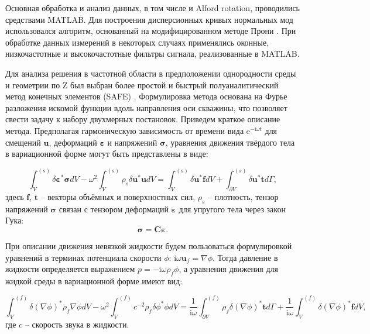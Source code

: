 \documentclass[a4paper,11pt]{article}
\newcommand{\ii}{\mathrm{i}}
\begin{document}
Основная обработка и анализ данных, в том числе и Alford rotation, проводились средствами MATLAB. Для построения дисперсионных кривых нормальных мод использовался алгоритм, основанный на модифицированном методе Прони \cite{Ekstrom1995}. При обработке данных измерений в некоторых случаях применялись оконные, низкочастотные и высокочастотные фильтры сигнала, реализованные в MATLAB.   

Для анализа решения в частотной области в предположении однородности среды и геометрии по Z был выбран более простой и быстрый полуаналитический метод конечных элементов (SAFE) \cite{Bartoli2006}. Формулировка метода основана на Фурье разложения искомой функции вдоль направления оси скважины, что позволяет свести задачу к набору двухмерных постановок. Приведем краткое описание метода. Предполагая гармоническую зависимость от времени вида $\mathrm{e}^{-\ii\omega t}$ для смещений $\mathbf{u}$, деформаций $\boldsymbol{\varepsilon}$ и напряжений $\boldsymbol{\sigma}$, уравнения движения твёрдого тела в вариационной форме могут быть представлены в виде:

\begin{equation}
\int_{V}^{(s)}\delta \boldsymbol{\varepsilon}^* \boldsymbol{\sigma} dV - \omega^2 \int_{V}^{(s)} \rho_s \delta \mathbf{u}^*\mathbf{u}dV = \int_{V}^{(s)}\delta \mathbf{u}^* \mathbf{f} dV + \int_{\partial V}^{(s)}\delta \mathbf{u}^* \mathbf{t} d\Gamma, \label{var_eq_solid}
\end{equation}
здесь $\mathbf{f}$, $\mathbf{t}$ -- векторы объёмных и поверхностных сил, $\rho_s$ -- плотность, тензор напряжений $\boldsymbol{\sigma}$ связан с тензором деформаций $\boldsymbol{\varepsilon}$ для упругого тела через закон Гука:
$$
\boldsymbol{\sigma} = \mathbf{C}\boldsymbol{\varepsilon}.
$$

При описании движения невязкой жидкости будем пользоваться формулировкой уравнений в терминах потенциала скорости $\phi$: $\ii \omega \mathbf{u}_f = \nabla \phi$. Тогда давление в жидкости определяется выражением $p = -\ii \omega \rho_f \phi$, а уравнения движения для жидкой среды в вариационной форме имеют вид: 

\begin{equation}
\int_{V}^{(f)} \delta (\nabla\phi)^* \rho_f  \nabla \phi dV - \omega^2 \int_{V}^{(f)}  c^{-2} \rho_f \delta \phi^*  \phi dV = \frac{1}{\ii\omega}\int_{\partial V}^{(f)} \rho_f \delta(\nabla \phi)^* \mathbf{t} d\Gamma + \frac{1}{\ii\omega} \int_{V}^{(f)} \delta(\nabla \phi)^* \mathbf{f} dV, \label{var_eq_fluid}
\end{equation}
где $c$ -- скорость звука в жидкости.
\end{document}
